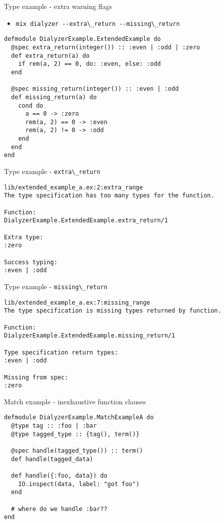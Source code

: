 \documentclass[
  ignorenonframetext,
]{beamer}
\newcommand{\passthrough}[1]{#1}
\providecommand{\tightlist}{%
  \setlength{\itemsep}{0pt}\setlength{\parskip}{0pt}}
\begin{document}
\begin{frame}[fragile]{Type example - extra warning flags}
\protect\hypertarget{type-example---extra-warning-flags}{}
\begin{itemize}
\tightlist
\item
  \passthrough{\lstinline!mix dialyzer --extra\_return --missing\_return!}
\end{itemize}

\begin{lstlisting}
defmodule DialyzerExample.ExtendedExample do
  @spec extra_return(integer()) :: :even | :odd | :zero
  def extra_return(a) do
    if rem(a, 2) == 0, do: :even, else: :odd
  end

  @spec missing_return(integer()) :: :even | :odd
  def missing_return(a) do
    cond do
      a == 0 -> :zero
      rem(a, 2) == 0 -> :even
      rem(a, 2) != 0 -> :odd
    end
  end
end
\end{lstlisting}
\end{frame}

\begin{frame}[fragile]{Type example -
\passthrough{\lstinline!extra\_return!}}
\protect\hypertarget{type-example---extra_return}{}
\begin{lstlisting}
lib/extended_example_a.ex:2:extra_range
The type specification has too many types for the function.

Function:
DialyzerExample.ExtendedExample.extra_return/1

Extra type:
:zero

Success typing:
:even | :odd

\end{lstlisting}
\end{frame}

\begin{frame}[fragile]{Type example -
\passthrough{\lstinline!missing\_return!}}
\protect\hypertarget{type-example---missing_return}{}
\begin{lstlisting}
lib/extended_example_a.ex:7:missing_range
The type specification is missing types returned by function.

Function:
DialyzerExample.ExtendedExample.missing_return/1

Type specification return types:
:even | :odd

Missing from spec:
:zero

\end{lstlisting}
\end{frame}

\begin{frame}[fragile]{Match example - inexhaustive function clauses}
\protect\hypertarget{match-example---inexhaustive-function-clauses}{}
\begin{lstlisting}
defmodule DialyzerExample.MatchExampleA do
  @type tag :: :foo | :bar
  @type tagged_type :: {tag(), term()}

  @spec handle(tagged_type()) :: term()
  def handle(tagged_data)

  def handle({:foo, data}) do
    IO.inspect(data, label: "got foo")
  end

  # where do we handle :bar??
end
\end{lstlisting}
\end{frame}
\end{document}
